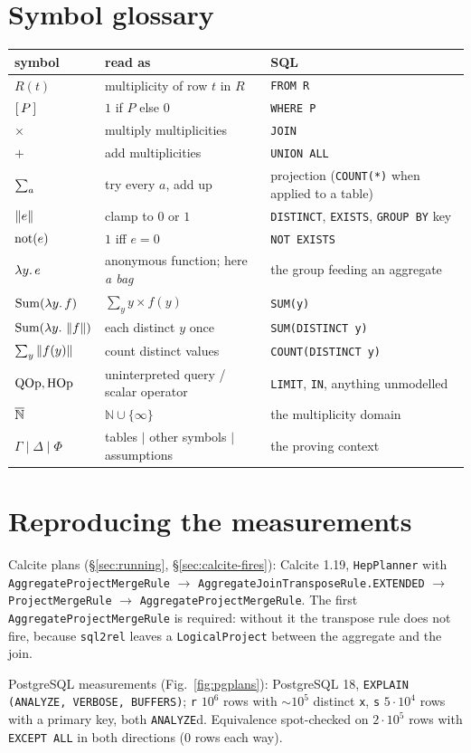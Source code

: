 \section{Symbol glossary}

\begin{center}
\begin{tabularx}{\linewidth}{@{}llX@{}}
\toprule
symbol & read as & SQL\\
\midrule
$R(t)$ & multiplicity of row $t$ in $R$ & \lstinline|FROM R|\\
$[\,P\,]$ & $1$ if $P$ else $0$ & \lstinline|WHERE P|\\
$\times$ & multiply multiplicities & \lstinline|JOIN|\\
$+$ & add multiplicities & \lstinline|UNION ALL|\\
$\sum_{a}$ & try every $a$, add up & projection (\lstinline|COUNT(*)| when applied to a table)\\
$\left\lVert e \right\rVert$ & clamp to $0$ or $1$ & \lstinline|DISTINCT|, \lstinline|EXISTS|, \lstinline|GROUP BY| key\\
$\mathrm{not}(e)$ & $1$ iff $e=0$ & \lstinline|NOT EXISTS|\\
$\lambda y.\,e$ & anonymous function; here \emph{a bag} & the group feeding an aggregate\\
$\mathrm{Sum}(\lambda y.\,f)$ & $\sum_y y\times f(y)$ & \lstinline|SUM(y)|\\
$\mathrm{Sum}(\lambda y.\,\left\lVert f \right\rVert)$ & each distinct $y$ once & \lstinline|SUM(DISTINCT y)|\\
$\sum_{y}\left\lVert f(y) \right\rVert$ & count distinct values & \lstinline|COUNT(DISTINCT y)|\\
$\mathrm{QOp},\mathrm{HOp}$ & uninterpreted query / scalar operator & \lstinline|LIMIT|, \lstinline|IN|, anything unmodelled\\
$\overline{\mathbb{N}}$ & $\mathbb{N}\cup\{\infty\}$ & the multiplicity domain\\
$\Gamma\mid\Delta\mid\Phi$ & tables $\mid$ other symbols $\mid$ assumptions & the proving context\\
\bottomrule
\end{tabularx}
\end{center}

\section{Reproducing the measurements}

Calcite plans (\S\ref{sec:running}, \S\ref{sec:calcite-fires}): Calcite 1.19,
\texttt{HepPlanner} with
\texttt{AggregateProjectMergeRule} $\to$ \texttt{AggregateJoinTransposeRule.EXTENDED} $\to$
\texttt{ProjectMergeRule} $\to$ \texttt{AggregateProjectMergeRule}. The first
\texttt{AggregateProjectMergeRule} is required: without it the transpose rule does not fire,
because \texttt{sql2rel} leaves a \texttt{LogicalProject} between the aggregate and the join.

PostgreSQL measurements (Fig.~\ref{fig:pgplans}): PostgreSQL 18,
\lstinline|EXPLAIN (ANALYZE, VERBOSE, BUFFERS)|; \texttt{r} $10^6$ rows with $\sim10^5$
distinct \texttt{x}, \texttt{s} $5\cdot10^4$ rows with a primary key, both \texttt{ANALYZE}d.
Equivalence spot-checked on $2\cdot10^5$ rows with \lstinline|EXCEPT ALL| in both
directions ($0$ rows each way).
